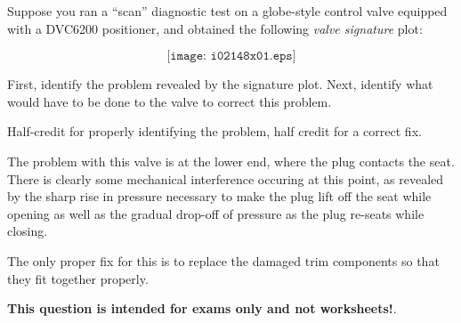 

Suppose you ran a ``scan'' diagnostic test on a globe-style control valve equipped with a DVC6200 positioner, and obtained the following {\it valve signature} plot:

$$\texttt{[image: i02148x01.eps]}$$

First, identify the problem revealed by the signature plot.  Next, identify what would have to be done to the valve to correct this problem.







Half-credit for properly identifying the problem, half credit for a correct fix.

\vskip 10pt

The problem with this valve is at the lower end, where the plug contacts the seat.  There is clearly some mechanical interference occuring at this point, as revealed by the sharp rise in pressure necessary to make the plug lift off the seat while opening as well as the gradual drop-off of pressure as the plug re-seats while closing.

\vskip 10pt

The only proper fix for this is to replace the damaged trim components so that they fit together properly.







{\bf This question is intended for exams only and not worksheets!}.



